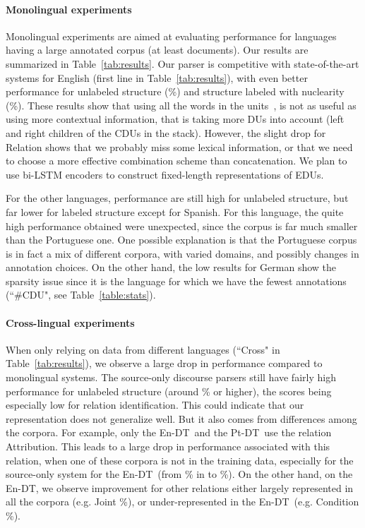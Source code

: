 \documentclass[11pt]{article}
\newcommand{\enrst}{En-DT}
\newcommand{\ptrst}{Pt-DT}
\newcommand{\crel}[1]{{\sc #1}\xspace}
\begin{document}
\paragraph{Monolingual experiments}
Monolingual experiments are aimed at evaluating performance for languages having a large annotated corpus (at least  documents).
Our results are summarized in Table~\ref{tab:results}. 
Our parser is competitive with state-of-the-art systems for English (first line in Table~\ref{tab:results}), with even better performance for unlabeled structure (\%) and structure labeled with nuclearity (\%).
These results show that using all the words in the units~\cite{ji:representation:2014,li:recursive:2014}, is not as useful as using more contextual information, that is taking more DUs into account (left and right children of the CDUs in the stack). 
However, the slight drop for Relation shows that we probably miss some lexical information, or that we need to choose a more effective combination scheme than concatenation.
We plan to use bi-LSTM encoders \cite{Hochreiter:Schmidhuber:97} to construct fixed-length representations of EDUs.

For the other languages, performance are still high for unlabeled structure, but far lower for labeled structure except for Spanish.
For this language, the quite high performance obtained were unexpected, since the corpus is far much smaller than the Portuguese one.
One possible explanation is that the Portuguese corpus is in fact a mix of different corpora, with varied domains, and possibly changes in annotation choices. 
On the other hand, the low results for German show the sparsity issue since it is the language for which we have the fewest annotations (``\#CDU", see Table~\ref{table:stats}).


\paragraph{Cross-lingual experiments}
When only relying on data from different languages (``Cross" in Table~\ref{tab:results}), we observe a large drop in performance compared to monolingual systems.
The source-only discourse parsers still have fairly high performance for unlabeled structure (around \% or higher), the scores being especially low for relation identification.
This could indicate that our representation does not generalize well.
But it also comes from differences among the corpora. For example, only the \enrst\ and the \ptrst\ use the relation \crel{Attribution}.
This leads to a large drop in performance associated with this relation, when one of these corpora is not in the training data, especially for the source-only system for the \enrst\ (from \% in  to \%).
On the other hand, on the \enrst, we observe improvement for other relations either largely represented in all the corpora (e.g. \crel{Joint} \%), or under-represented in the \enrst\ (e.g. \crel{Condition} \%).
\end{document}
